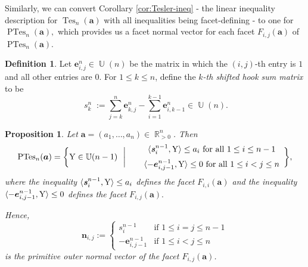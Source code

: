 \documentclass[12pt]{amsart}
\numberwithin{equation}{section}
\newtheorem{prop}[thm]{Proposition}
\theoremstyle{definition}
\newtheorem{defn}[thm]{Definition}
\def\tes{\operatorname{Tes}}
\def\ptes{\operatorname{PTes}}
\def\ba{{\boldsymbol{a}}}
\def\be{{\boldsymbol{e}}}
\def\bn{\boldsymbol{n}}
\def\sm{\boldsymbol{\operatorname{\mathit{s}}}}
\def\YY{{\rm{Y}}}
\def\U{\operatorname{\mathbb{U}}}
\def\R{\operatorname{\mathbb{R}}}
\begin{document}
Similarly, we can convert Corollary \ref{cor:Tesler-ineq} - the linear inequality description for $\tes_n(\ba)$ with all inequalities being facet-defining - to one for $\ptes_n(\ba),$ which provides us a facet normal vector for each facet $F_{i,j}(\ba)$ of $\ptes_{n}(\ba)$.

\begin{defn} \label{shiftedhs}
	    Let $\be_{i,j}^n \in \U(n)$ be the matrix in which the $(i,j)$-th entry is $1$ and all other entries are $0$.
	    For $1 \leq k \leq n$, define the \emph{$k$-th shifted hook sum matrix} to be
    \[\sm_k^{n}:=\sum_{j=k}^{n} \be_{k,j}^{n} - \sum_{i=1}^{k-1} \be_{i,k-1}^{n} \in \U(n).\]
\end{defn}
\begin{prop} \label{prop:projnormal}
	Let $\ba=(a_{1},\dots,a_{n}) \in \R_{> 0}^n$. 
    Then 
    \[ \ptes_n(\ba) = \biggl\{\YY \in \U(n-1)~~\biggl{|}~~
	    \begin{array}{lcl}
		    & \langle \sm_i^{n-1}, \YY \rangle \le a_i \text{ for all }1 \le i \le n-1\\[2mm]
		    & \langle -\be_{i,j-1}^{n-1}, \YY \rangle \le 0 \text{  for all }1 \leq i < j \leq n\\
 \end{array}
 \biggl\},\]
 where the inequality $\langle \sm_i^{n-1}, \YY \rangle \le a_i$ defines the facet $F_{i,i}(\ba)$ and the inequality $\langle -\be_{i,j-1}^{n-1}, \YY \rangle \le 0$ defines the facet $F_{i,j}(\ba).$

Hence, 
\begin{equation}\label{eq:defnnormal}
  \bn_{i,j}:=\begin{cases}
      \sm_i^{n-1}  & \text{if } {1 \le i=j \le n-1} \\
      -\be_{i,j-1}^{n-1} & \text{if } {1\le i<j \le n} 
    \end{cases} 
  \end{equation}
    is the primitive outer normal vector of the facet $F_{i,j}(\ba)$. 
\end{prop}
\end{document}
